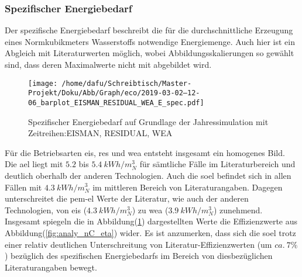 \documentclass[onecolumn,10pt,titlepage]{article}
\begin{document}
%
%



\subsubsection{Spezifischer Energiebedarf}
Der spezifische Energiebedarf beschreibt die für die durchschnittliche Erzeugung eines Normkubikmeters Wasserstoffs notwendige Energiemenge. Auch hier ist ein Abgleich mit Literaturwerten möglich, wobei Abbildungsskalierungen so gewählt sind, dass deren Maximalwerte nicht mit abgebildet wird.\\
\begin{figure}[H]
	
	\centering
	\texttt{[image: /home/dafu/Schreibtisch/Master-Projekt/Doku/Abb/Graph/eco/2019-03-02--12-06\_barplot\_EISMAN\_RESIDUAL\_WEA\_E\_spec.pdf]}
	\caption[Spezifischer Energiebedarf EIS, RES, WEA]{Spezifischer Energiebedarf auf Grundlage der Jahressimulation mit Zeitreihen:EISMAN, RESIDUAL, WEA }
	\label{fig:analy_nC_Espec} 
\end{figure}
Für die Betriebsarten \gls{eis}, \gls{res} und \gls{wea} entsteht insgesamt ein homogenes Bild. Die \gls{ael} liegt mit $5.2$ bis $5.4~kWh/m^3_N$ für sämtliche Fälle im Literaturbereich und deutlich oberhalb der anderen Technologien. Auch die \gls{soel} befindet sich in allen Fällen mit $4.3~kWh/m^3_N$ im mittleren Bereich von Literaturangaben. Dagegen unterschreitet die \gls{pem}-\gls{el} Werte der Literatur, wie auch der anderen Technologien, von \gls{eis} ($4.3~kWh/m^3_N$) zu \gls{wea} ($3.9~kWh/m^3_N$) zunehmend. Insgesamt spiegeln die in Abbildung(\ref{fig:analy_nC_Espec}) dargestellten Werte die Effizienzwerte aus Abbildung(\ref{fig:analy_nC_eta}) wider. Es ist anzumerken, dass sich die \gls{soel} trotz einer relativ deutlichen Unterschreitung von Literatur-Effizienzwerten (um $ca.~7\%$) bezüglich des spezifischen Energiebedarfs im Bereich von diesbezüglichen Literaturangaben bewegt.
\end{document}
